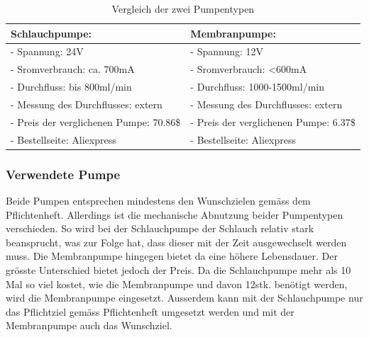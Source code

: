 \begin{table}[h!]
\begin{tabularx}{\textwidth}{|X|X|}
\hline
\textbf{Schlauchpumpe:} & \textbf{Membranpumpe:}
\\
\hline
- Spannung: 24V & - Spannung: 12V \\

- Sromverbrauch: ca. 700mA & - Sromverbrauch: <600mA\\

- Durchfluss: bis 800ml/min & - Durchfluss: 1000-1500ml/min\\

- Messung des Durchflusses: extern & - Messung des Durchflusses: extern\\

- Preis der verglichenen Pumpe: 70.86\$  & - Preis der verglichenen Pumpe: 6.37\$\\

- Bestellseite: Aliexpress & - Bestellseite: Aliexpress\\

\hline
\end{tabularx}
\caption{Vergleich der zwei Pumpentypen \cite{aiyimaindustrial_store_us_nodate}\cite{dongguan_honlite_industrial_co._ltd._800_nodate}}
\end{table}

\subsubsection{Verwendete Pumpe}\label{par:Verwendete_Pumpe}

Beide Pumpen entsprechen mindestens den Wunschzielen gemäss dem Pflichtenheft. Allerdings ist die mechanische Abnutzung beider Pumpentypen verschieden. So wird bei der Schlauchpumpe der Schlauch relativ stark beansprucht, was zur Folge hat, dass dieser mit der Zeit ausgewechselt werden muss. Die Membranpumpe hingegen bietet da eine höhere Lebensdauer. Der grösste Unterschied bietet jedoch der Preis. Da die Schlauchpumpe mehr als 10 Mal so viel kostet, wie die Membranpumpe und davon 12stk. benötigt werden, wird die Membranpumpe eingesetzt. Ausserdem kann mit der Schlauchpumpe nur das Pflichtziel gemäss Pflichtenheft umgesetzt werden und mit der Membranpumpe auch das Wunschziel. 